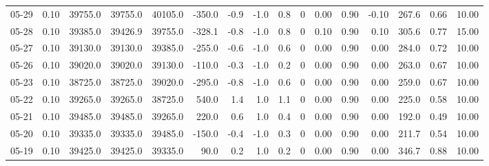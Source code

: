 \begin{threeparttable}
{\begin{tabular}{lrrrrrrrrrrrrrrr}
  05-29 &     0.10 & 39755.0 & 39755.0 & 40105.0 &     -350.0 &           -0.9 &                     -1.0 &                 0.8 &              0 &       0.00 &      0.90 &          -0.10 &            267.6 &            0.66 &                  10.00 \\
  05-28 &     0.10 & 39385.0 & 39426.9 & 39755.0 &     -328.1 &           -0.8 &                     -1.0 &                 0.8 &              0 &       0.10 &      0.90 &           0.10 &            305.6 &            0.77 &                  15.00 \\
  05-27 &     0.10 & 39130.0 & 39130.0 & 39385.0 &     -255.0 &           -0.6 &                     -1.0 &                 0.6 &              0 &       0.00 &      0.90 &           0.00 &            284.0 &            0.72 &                  10.00 \\
  05-26 &     0.10 & 39020.0 & 39020.0 & 39130.0 &     -110.0 &           -0.3 &                     -1.0 &                 0.2 &              0 &       0.00 &      0.90 &           0.00 &            263.0 &            0.67 &                  10.00 \\
  05-23 &     0.10 & 38725.0 & 38725.0 & 39020.0 &     -295.0 &           -0.8 &                     -1.0 &                 0.6 &              0 &       0.00 &      0.90 &           0.00 &            259.0 &            0.67 &                  10.00 \\
  05-22 &     0.10 & 39265.0 & 39265.0 & 38725.0 &      540.0 &            1.4 &                      1.0 &                 1.1 &              0 &       0.00 &      0.90 &           0.00 &            225.0 &            0.58 &                  10.00 \\
  05-21 &     0.10 & 39485.0 & 39485.0 & 39265.0 &      220.0 &            0.6 &                      1.0 &                 0.4 &              0 &       0.00 &      0.90 &           0.00 &            192.0 &            0.49 &                  10.00 \\
  05-20 &     0.10 & 39335.0 & 39335.0 & 39485.0 &     -150.0 &           -0.4 &                     -1.0 &                 0.3 &              0 &       0.00 &      0.90 &           0.00 &            211.7 &            0.54 &                  10.00 \\
  05-19 &     0.10 & 39425.0 & 39425.0 & 39335.0 &       90.0 &            0.2 &                      1.0 &                 0.2 &              0 &       0.00 &      0.90 &           0.00 &            346.7 &            0.88 &                  10.00 \\

\end{tabular}}
\end{threeparttable}
